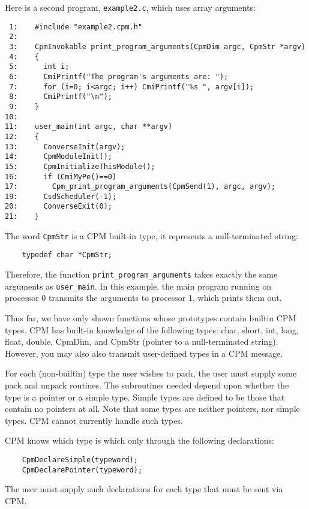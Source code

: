 Here is a second program, {\tt example2.c}, which uses array arguments:

\begin{verbatim}
 1:    #include "example2.cpm.h"
 2:   
 3:    CpmInvokable print_program_arguments(CpmDim argc, CpmStr *argv)
 4:    {
 5:      int i;
 6:      CmiPrintf("The program's arguments are: ");
 7:      for (i=0; i<argc; i++) CmiPrintf("%s ", argv[i]);
 8:      CmiPrintf("\n");
 9:    }
10:
11:    user_main(int argc, char **argv)
12:    {
13:      ConverseInit(argv);
14:      CpmModuleInit();
15:      CpmInitializeThisModule();
16:      if (CmiMyPe()==0)
17:        Cpm_print_program_arguments(CpmSend(1), argc, argv);
19:      CsdScheduler(-1);
20:      ConverseExit(0);
21:    }
\end{verbatim}

The word {\tt CpmStr} is a CPM built-in type, it represents a
null-terminated string:

\begin{verbatim}
	typedef char *CpmStr;
\end{verbatim}

Therefore, the function {\tt print\_program\_arguments} takes exactly
the same arguments as {\tt user\_main}.  In this example, the main
program running on processor 0 transmits the arguments to processor 1,
which prints them out.

Thus far, we have only shown functions whose prototypes contain
builtin CPM types.  CPM has built-in knowledge of the following types:
char, short, int, long, float, double, CpmDim, and CpmStr (pointer to
a null-terminated string).  However, you may also also transmit
user-defined types in a CPM message.

For each (non-builtin) type the user wishes to pack, the user must
supply some pack and unpack routines.  The subroutines needed depend
upon whether the type is a pointer or a simple type.  Simple types are
defined to be those that contain no pointers at all.  Note that some
types are neither pointers, nor simple types.  CPM cannot currently
handle such types.

CPM knows which type is which only through the following declarations:

\begin{verbatim}
    CpmDeclareSimple(typeword);
    CpmDeclarePointer(typeword);
\end{verbatim}

The user must supply such declarations for each type that must be sent
via CPM.

